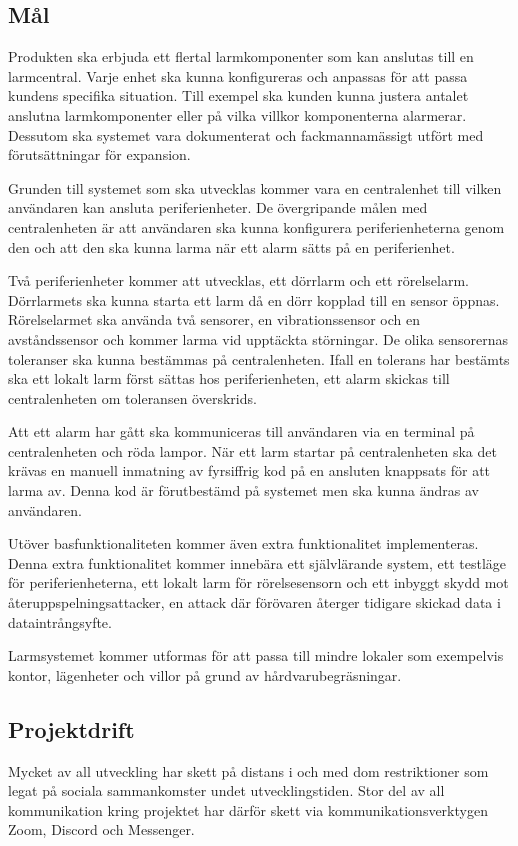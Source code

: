 \documentclass[a4paper]{article}
\begin{document}
\subsection{Mål}

Produkten ska erbjuda ett flertal larmkomponenter som kan anslutas till en larmcentral.
Varje enhet ska kunna konfigureras och anpassas för att passa kundens specifika situation.
Till exempel ska kunden kunna justera antalet anslutna larmkomponenter eller på vilka villkor komponenterna alarmerar.
Dessutom ska systemet vara dokumenterat och fackmannamässigt utfört med förutsättningar för expansion.

Grunden till systemet som ska utvecklas kommer vara en centralenhet till vilken användaren kan ansluta periferienheter. De övergripande målen med centralenheten är att användaren ska kunna konfigurera periferienheterna genom den och att den ska kunna larma när ett alarm sätts på en periferienhet.

Två periferienheter kommer att utvecklas, ett dörrlarm och ett rörelselarm.
Dörrlarmets ska kunna starta ett larm då en dörr kopplad till en sensor öppnas.
Rörelselarmet ska använda två sensorer, en vibrationssensor och en avståndssensor och kommer larma vid upptäckta störningar.
De olika sensorernas toleranser ska kunna bestämmas på centralenheten.
Ifall en tolerans har bestämts ska ett lokalt larm först sättas hos periferienheten, ett alarm skickas till centralenheten om toleransen överskrids.

Att ett alarm har gått ska kommuniceras till användaren via en terminal på centralenheten och röda lampor.
När ett larm startar på centralenheten ska det krävas en manuell inmatning av fyrsiffrig kod på en ansluten knappsats för att larma av.
Denna kod är förutbestämd på systemet men ska kunna ändras av användaren.

Utöver basfunktionaliteten kommer även extra funktionalitet implementeras.
Denna extra funktionalitet kommer innebära ett självlärande system, ett testläge för periferienheterna, ett lokalt larm för rörelsesensorn och ett inbyggt skydd mot återuppspelningsattacker, en attack där förövaren återger tidigare skickad data i dataintrångsyfte.

Larmsystemet kommer utformas för att passa till mindre lokaler som exempelvis kontor, lägenheter och villor på grund av hårdvarubegräsningar.

\subsection{Projektdrift}
Mycket av all utveckling har skett på distans i och med dom restriktioner som legat på sociala sammankomster undet utvecklingstiden.
Stor del av all kommunikation kring projektet har därför skett via kommunikationsverktygen Zoom, Discord och Messenger.
\end{document}
